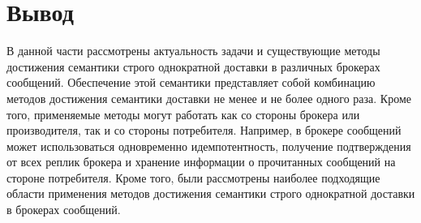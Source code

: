 \section{Вывод}
В данной части рассмотрены актуальность задачи и существующие методы достижения семантики строго однократной доставки в различных брокерах сообщений. 
Обеспечение этой семантики представляет собой комбинацию методов достижения семантики доставки не менее и не более одного раза. 
Кроме того, применяемые методы могут работать как со стороны брокера или производителя, так и со стороны потребителя. Например, в брокере сообщений может использоваться одновременно идемпотентность, получение подтверждения от всех реплик брокера и хранение информации о прочитанных сообщений на стороне потребителя.
Кроме того, были рассмотрены наиболее подходящие области применения методов достижения семантики строго однократной доставки в брокерах сообщений.